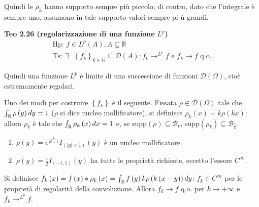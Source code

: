 \documentclass{article}
\begin{document}
Quindi le $\rho _{k}$ hanno supporto sempre pi\`{u} piccolo; di contro, dato
che l'integrale \`{e} sempre uno, assumono in tale supporto valori sempre pi%
\`{u} grandi.

\textbf{Teo 2.26 (regolarizzazione di una funzione }$L^{p}$\textbf{)}%
\begin{gather*}
\text{Hp}\text{: }f\in L^{p}\left( A\right) ,A\subseteq 
\mathbb{R}
\\
\text{Ts}\text{: }\exists \text{ }\left\{ f_{k}\right\} _{k\in 
\mathbb{N}
}\subseteq \mathcal{D}\left( A\right) :f_{k}\rightarrow ^{L^{p}}f\text{ e }%
f_{k}\rightarrow f\text{ q.o.}
\end{gather*}

Quindi una funzione $L^{p}$ \`{e} limite di una successione di funzioni $%
\mathcal{D}\left( \Omega \right) $, cio\`{e} estremamente regolari.

Uno dei modi per costruire $\left\{ f_{k}\right\} $ \`{e} il seguente.
Fissata $\rho \in \mathcal{D}\left( \Omega \right) $ tale che $\int_{%
\mathbb{R}
}\rho \left( y\right) dy=1$ ($\rho $ si dice nucleo mollificatore), si
definisce $\rho _{k}\left( x\right) =k\rho \left( kx\right) $: allora $\rho
_{k}$ \`{e} tale che $\int_{%
\mathbb{R}
}\rho _{k}\left( x\right) dx=1$ e, se supp$\left( \rho \right) \subseteq 
\mathcal{B}_{r}$, supp$\left( \rho _{k}\right) \subseteq \mathcal{B}_{\frac{r%
}{k}}$.
\begin{enumerate}
\item $\rho \left( y\right) =e^{\frac{1}{y^{2}-1}}I_{\left( \left\vert
y\right\vert <1\right) }\left( y\right) $ \`{e} un nucleo mollificatore.

\item $\rho \left( y\right) =\frac{1}{2}I_{\left( -1,1\right) }\left(
y\right) $ ha tutte le propriet\`{a} richieste, eccetto l'essere $C^{\infty
} $.
\end{enumerate}

Si definisce $f_{k}\left( x\right) =f\left( x\right) \ast \rho _{k}\left(
x\right) =\int_{%
\mathbb{R}
}f\left( y\right) k\rho \left( k\left( x-y\right) \right) dy$: $f_{k}\in
C^{\infty }$ per le propriet\`{a} di regolarit\`{a} della convoluzione.
Allora $f_{k}\rightarrow f$ q.o. per $k\rightarrow +\infty $ e $%
f_{k}\rightarrow ^{L^{p}}f$.
\end{document}
